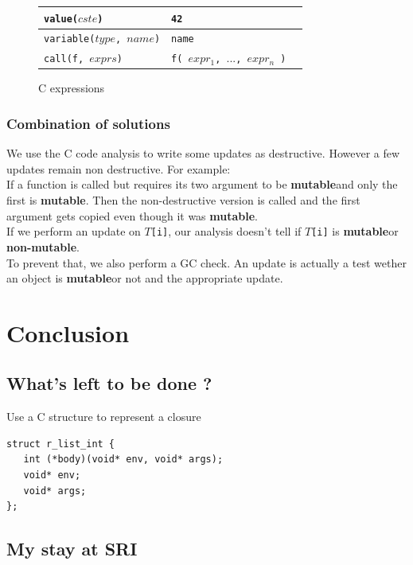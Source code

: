 \documentclass[12pt,a4paper,titlepage]{article}
\newcommand{\cl}[1]{\texttt{#1}}
\newcommand{\mut}{\textbf{mutable}}
\newcommand{\nmut}{\textbf{non-mutable}}
\begin{document}
\begin{figure}
\begin{tabular}{|p{50mm}|p{50mm}|p{50mm}|}
\hline
\cl{value($cste$)} & \cl{42} & \\ \hline
\cl{variable($type$, $name$)} & \cl{name} & \\ \hline
\cl{call(f, $exprs$)} & \cl{f( $expr_1$, $...$, $expr_n$ )} & \\ \hline
\end{tabular}
\caption{C expressions}
\end{figure}




\subsubsection{Combination of solutions}

We use the C code analysis to write some updates as destructive. However a few updates remain non destructive. For example:\\

If a function is called but requires its two argument to be \mut  and only the first is \mut. Then the non-destructive version is called and the first argument gets copied even though it was \mut.\\

If we perform an update on \cl{$T$[i]}, our analysis doesn't tell if \cl{$T$[i]} is \mut or \nmut.\\

To prevent that, we also perform a GC check. An update is actually a test wether an object is \mut or not and the appropriate update.




\section{Conclusion}

\subsection{What's left to be done ?}

Use a C structure to represent a closure
\begin{lstlisting}
struct r_list_int {
   int (*body)(void* env, void* args);
   void* env;
   void* args;
};
\end{lstlisting}



\subsection{My stay at SRI}
\end{document}
